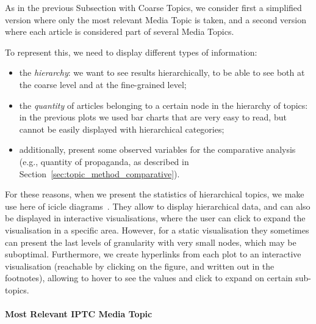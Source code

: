 






As in the previous Subsection with Coarse Topics, we consider first a simplified version where only the most relevant Media Topic is taken, and a second version where each article is considered part of several Media Topics.

To represent this, we need to display different types of information:

\begin{itemize}
    \item the \emph{hierarchy}: we want to see results hierarchically, to be able to see both at the coarse level and at the fine-grained level;
    \item the \emph{quantity} of articles belonging to a certain node in the hierarchy of topics: in the previous plots we used bar charts that are very easy to read, but cannot be easily displayed with hierarchical categories;
    \item additionally, present some observed variables for the comparative analysis (e.g., quantity of propaganda, as described in Section~\ref{sec:topic_method_comparative}).
\end{itemize}

For these reasons, when we present the statistics of hierarchical topics, we make use here of icicle diagrams~\cite{kruskal1983icicle}.
They allow to display hierarchical data, and can also be displayed in interactive visualisations, where the user can click to expand the visualisation in a specific area.
However, for a static visualisation they sometimes can present the last levels of granularity with very small nodes, which may be suboptimal.
Furthermore, we create hyperlinks from each plot to an interactive visualisation (reachable by clicking on the figure, and written out in the footnotes), allowing to hover to see the values and click to expand on certain sub-topics.

\paragraph{Most Relevant IPTC Media Topic}

